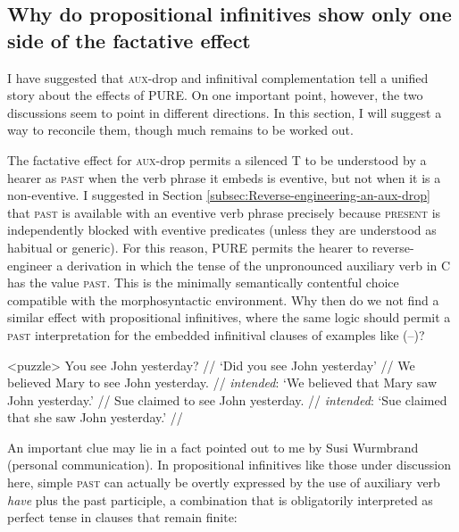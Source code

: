\documentclass[output=paper]{langscibook}
\begin{document}
\subsection{Why do propositional infinitives show only one side of the factative
effect}

\label{subsec:An-important-unsolved} I have suggested that \textsc{aux}-drop and infinitival complementation tell a unified story about the effects of PURE. On one important point, however, the two discussions seem to point in different directions. In this section, I will suggest a way to reconcile them, though much remains to be worked out. 

The factative effect for \textsc{aux}-drop permits a silenced T to be understood by a hearer as \textsc{past} when the verb phrase it embeds is eventive, but not when it is a non-eventive. I suggested in Section \ref{subsec:Reverse-engineering-an-aux-drop} that \textsc{past} is available with an eventive verb phrase precisely because \textsc{present} is independently blocked with eventive predicates (unless they are understood as habitual or generic). For this reason, PURE permits the hearer to reverse-engineer a derivation in which the tense of the unpronounced auxiliary verb in C has the value \textsc{past}. This is the minimally semantically contentful choice compatible with the morphosyntactic environment. Why then do we not find a similar effect with propositional infinitives, where the same logic should permit a \textsc{past} interpretation for the embedded infinitival clauses of examples like (--)? 

\pex<puzzle>
\a
\begingl
\gla You see John yesterday?  //
\glft `Did you see John yesterday' //
\endgl 
\a 
\begingl 
\gla \ljudge*We believed Mary to see John yesterday.  //
\glft \textit{intended}: `We believed that Mary saw John yesterday.' //
\endgl
\a
\begingl
\gla  \ljudge*Sue claimed to see John yesterday. //
\glft \textit{intended}: `Sue claimed that she saw John yesterday.' //
\endgl
\xe

An important clue may lie in a fact pointed out to me by Susi Wurmbrand (personal communication). In propositional infinitives like those under discussion here, simple \textsc{past} can actually be overtly expressed by the use of auxiliary verb \textit{have} plus the past participle, a combination that is obligatorily interpreted as perfect tense in clauses that remain finite:
\end{document}
